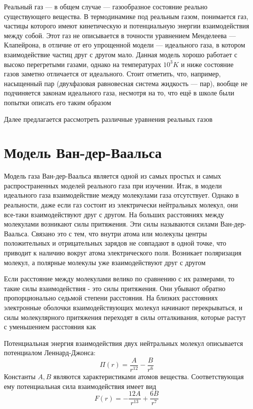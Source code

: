 \documentclass[a4paper, 14pt]{article}
\begin{document}
    Реальный газ — в общем случае — газообразное состояние реально существующего вещества.
    В термодинамике под реальным газом, понимается газ, частицы которого имеют кинетическую и потенциальную энергии
    взаимодействия между собой.
    Этот газ не описывается в точности уравнением Менделеева — Клапейрона, в отличие от его упрощенной модели —
    идеального газа, в котором взаимодействие частиц друг с другом мало.
    Данная модель хорошо работает с высоко перегретыми газами, однако на температурах $10^3 K$ и ниже состояние газов
    заметно отличается от идеального.
    Стоит отметить, что, например, насыщенный пар (двухфазовая равновесная система жидкость — пар), вообще не
    подчиняется законам идеального газа, несмотря на то, что ещё в школе были попытки описать его таким образом

    Далее предлагается рассмотреть различные уравнения реальных газов


    \section*{Модель Ван-дер-Ваальса} 

    Модель газа Ван-дер-Ваальса является одной из самых простых и самых распространенных моделей реального газа при
    изучении.
    Итак, в модели идеального газа взаимодействие между молекулами газа отсутствует.
    Однако в реальности, даже если газ состоит из электрически нейтральных молекул, они все-таки взаимодействуют друг
    с другом.
    На больших расстояниях между молекулами возникают силы притяжения.
    Эти силы называются силами Ван-дер-Ваальса.
    Связано это с тем, что внутри атома или молекулы центры положительных и отрицательных зарядов не совпадают в
    одной точке, что приводит к наличию вокруг атома электрического поля.
    Возникает поляризация молекул, а полярные молекулы уже взаимодействуют друг с другом

    Если расстояние между молекулами велико по сравнению с их размерами, то такие силы взаимодействия - это силы
    притяжения.
    Они убывают обратно пропорционально седьмой степени расстояния.
    На близких расстояниях электронные оболочки взаимодействующих молекул начинают перекрываться, и силы
    молекулярного притяжения переходят в силы отталкивания, которые растут с уменьшением расстояния как

    Потенциальная энергия взаимодействия двух нейтральных молекул описывается потенциалом Леннард-Джонса:
    \[ \Pi (r) = \frac{A}{r^{12}} - \frac{B}{r^6} \]
    Константы $A, B$ являются характеристиками атомов вещества.
    Соответствующая ему потенциальная сила взаимодействия имеет вид
    \[ F(r) = - \frac{12A}{r^{13}} + \frac{6B}{r^7} \]
\end{document}
